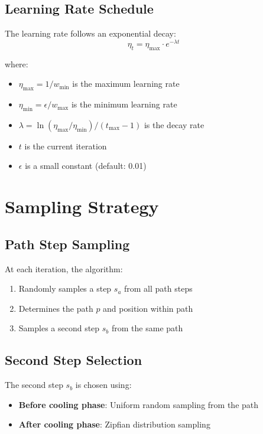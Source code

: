 \documentclass{article}
\begin{document}
\subsection{Learning Rate Schedule}

The learning rate follows an exponential decay:
\begin{equation}
\eta_t = \eta_{\max} \cdot e^{-\lambda t}
\end{equation}

where:
\begin{itemize}
    \item $\eta_{\max} = 1/w_{\min}$ is the maximum learning rate
    \item $\eta_{\min} = \epsilon/w_{\max}$ is the minimum learning rate
    \item $\lambda = \ln(\eta_{\max}/\eta_{\min})/(t_{\max} - 1)$ is the decay rate
    \item $t$ is the current iteration
    \item $\epsilon$ is a small constant (default: 0.01)
\end{itemize}

\section{Sampling Strategy}

\subsection{Path Step Sampling}

At each iteration, the algorithm:
\begin{enumerate}
    \item Randomly samples a step $s_a$ from all path steps
    \item Determines the path $p$ and position within path
    \item Samples a second step $s_b$ from the same path
\end{enumerate}

\subsection{Second Step Selection}

The second step $s_b$ is chosen using:

\begin{itemize}
    \item \textbf{Before cooling phase}: Uniform random sampling from the path
    \item \textbf{After cooling phase}: Zipfian distribution sampling
\end{itemize}
\end{document}
